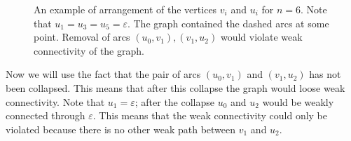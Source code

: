 \begin{figure}[ht]
\begin{center}

\end{center}

\caption{An example of arrangement of the vertices $ v_i $ and $ u_i $ for $ n = 6 $. Note that $u_1=u_3=u_5=\varepsilon$. The graph contained the dashed arcs at some point. Removal of arcs $(u_0, v_1), (v_1, u_2)$ would violate weak connectivity of the graph.}\label{fig:lvl2pathuv}
\end{figure}

Now we will use the fact that the pair of arcs $ (u_0, v_1) $ and $ (v_1, u_2) $ has not been collapsed. This means that after this collapse the graph would loose weak connectivity. Note that $ u_1 = \varepsilon $; after the collapse $ u_0 $ and $ u_2 $ would be weakly connected through $ \varepsilon $. This means that the weak connectivity could only be violated because there is no other weak path between $ v_1 $ and $ u_2 $.

